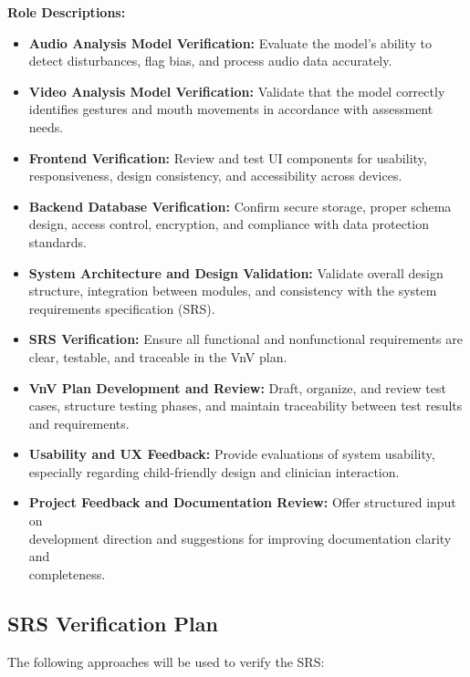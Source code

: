 \documentclass[12pt, titlepage]{article}
\begin{document}
\vspace{1em}

\noindent\textbf{Role Descriptions:}
\begin{itemize}
  \item \textbf{Audio Analysis Model Verification:} Evaluate the model’s ability to detect disturbances, flag bias, and process audio data accurately.
  \item \textbf{Video Analysis Model Verification:} Validate that the model correctly identifies gestures and mouth movements in accordance with assessment needs.
  \item \textbf{Frontend Verification:} Review and test UI components for usability, responsiveness, design consistency, and accessibility across devices.
  \item \textbf{Backend Database Verification:} Confirm secure storage, proper schema design, access control, encryption, and compliance with data protection standards.
  \item \textbf{System Architecture and Design Validation:} Validate overall design structure, integration between modules, and consistency with the system requirements specification (SRS).
  \item \textbf{SRS Verification:} Ensure all functional and nonfunctional requirements are clear, testable, and traceable in the VnV plan.
  \item \textbf{VnV Plan Development and Review:} Draft, organize, and review test cases, structure testing phases, and maintain traceability between test results and requirements.
  \item \textbf{Usability and UX Feedback:} Provide evaluations of system usability, especially regarding child-friendly design and clinician interaction.
  \item \textbf{Project Feedback and Documentation Review:} Offer structured input on \\ development direction and suggestions for improving documentation clarity and \\ completeness.
\end{itemize}

\subsection{SRS Verification Plan}

The following approaches will be used to verify the SRS:
\end{document}
